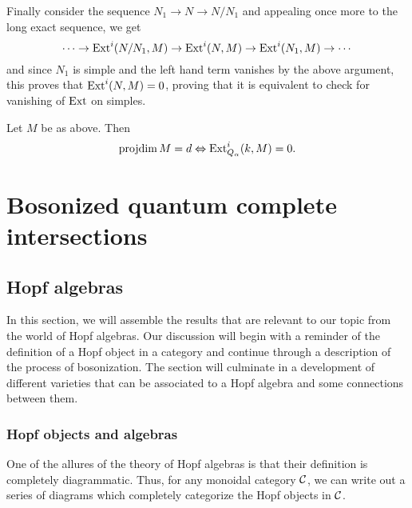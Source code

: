\documentclass [11pt, proquest] {uwthesis}[2020/02/24]
\begin{document}
{\begin{prf}
        Finally consider the sequence $N_1\to N\to N/N_1$ and appealing once more to the long exact sequence, we get
        \[\cdots\to \operatorname{Ext}^i(N/N_1,M)\to \operatorname{Ext}^i(N,M)\to \operatorname{Ext}^i(N_1,M)\to \cdots\]
        and since $N_1$ is simple and the left hand term vanishes by the above argument, this proves that $\operatorname{Ext}^i(N,M)=0$, proving that it is equivalent to check for vanishing of $\operatorname{Ext}$ on simples.
    \end{prf}
    \begin{lem}
        Let $M$ be as above. Then
        \[\operatorname{projdim} M=d \Leftrightarrow \operatorname{Ext}_{Q_\alpha}^i(k,M)=0.\]
    \end{lem}}





 
 


\part{Bosonized quantum complete intersections}\label{prt:bqci}

\chapter{Hopf algebras}
    In this section, we will assemble the results that are relevant to our topic from the world of Hopf algebras. Our discussion will begin with a reminder of the definition of a Hopf object in a category and continue through a description of the process of bosonization. The section will culminate in a development of different varieties that can be associated to a Hopf algebra and some connections between them.

\section{Hopf objects and algebras}
    One of the allures of the theory of Hopf algebras is that their definition is completely diagrammatic. Thus, for any monoidal category $\mathcal{C}$, we can write out a series of diagrams which completely categorize the Hopf objects in $\mathcal{C}$.
\end{document}
